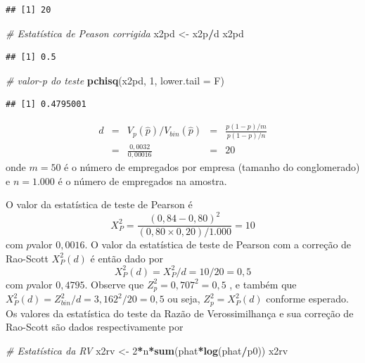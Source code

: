 \documentclass[]{book}
\newenvironment{Shaded}{\begin{snugshade}}{\end{snugshade}}
\newcommand{\KeywordTok}[1]{\textcolor[rgb]{0.13,0.29,0.53}{\textbf{#1}}}
\newcommand{\DataTypeTok}[1]{\textcolor[rgb]{0.13,0.29,0.53}{#1}}
\newcommand{\DecValTok}[1]{\textcolor[rgb]{0.00,0.00,0.81}{#1}}
\newcommand{\StringTok}[1]{\textcolor[rgb]{0.31,0.60,0.02}{#1}}
\newcommand{\CommentTok}[1]{\textcolor[rgb]{0.56,0.35,0.01}{\textit{#1}}}
\newcommand{\OperatorTok}[1]{\textcolor[rgb]{0.81,0.36,0.00}{\textbf{#1}}}
\newcommand{\NormalTok}[1]{#1}
\theoremstyle{definition}
\theoremstyle{definition}
\theoremstyle{definition}
\theoremstyle{remark}
\begin{document}
\begin{verbatim}
## [1] 20
\end{verbatim}

\begin{Shaded}
\begin{Highlighting}[]
\CommentTok{# Estatística de Peason corrigida}
\NormalTok{x2pd <-}\StringTok{ }\NormalTok{x2p}\OperatorTok{/}\NormalTok{d}
\NormalTok{x2pd}
\end{Highlighting}
\end{Shaded}

\begin{verbatim}
## [1] 0.5
\end{verbatim}

\begin{Shaded}
\begin{Highlighting}[]
\CommentTok{# valor-p do teste}
\KeywordTok{pchisq}\NormalTok{(x2pd, }\DecValTok{1}\NormalTok{, }\DataTypeTok{lower.tail =}\NormalTok{ F)}
\end{Highlighting}
\end{Shaded}

\begin{verbatim}
## [1] 0.4795001
\end{verbatim}

\[
\begin{array}{llcll}
d & = & V_{p}\left( \widehat{p}\right) /V_{bin}\left( \widehat{p}\right) & =
& \frac{p\left( 1-p\right) /m}{p\left( 1-p\right) /n} \\ 
& = & \frac{0,0032}{0,00016} & = & 20
\end{array}
\] onde \(m=50\) é o número de empregados por empresa (tamanho do
conglomerado) e \(n=1.000\) é o número de empregados na amostra.

O valor da estatística de teste de Pearson é \[
X_{P}^{2}=\frac{\left( 0,84-0,80\right) ^{2}}{\left( 0,80\times 0,20\right)
/1.000}=10 
\] com \(p\)valor \(0,0016\). O valor da estatística de teste de Pearson
com a correção de Rao-Scott \(X_{P}^{2}(d)\) é então dado por \[
X_{P}^{2}(d)=X_{P}^{2}/d=10/20=0,5 
\] com \(p\)valor \(0,4795\). Observe que \(Z_{p}^{2}=0,707^{2}=0,5\) ,
e também que \(X_{P}^{2}(d)=Z_{bin}^{2}/d= 3,162^{2}/20=0,5\) ou seja,
\(Z_{p}^{2}=X_{P}^{2}(d)\) conforme esperado. Os valores da estatística
do teste da Razão de Verossimilhança e sua correção de Rao-Scott são
dados respectivamente por

\begin{Shaded}
\begin{Highlighting}[]
\CommentTok{# Estatística da RV}
\NormalTok{x2rv <-}\StringTok{ }\DecValTok{2}\OperatorTok{*}\NormalTok{n}\OperatorTok{*}\KeywordTok{sum}\NormalTok{(phat}\OperatorTok{*}\KeywordTok{log}\NormalTok{(phat}\OperatorTok{/}\NormalTok{p0))}
\NormalTok{x2rv}
\end{Highlighting}
\end{Shaded}
\end{document}
